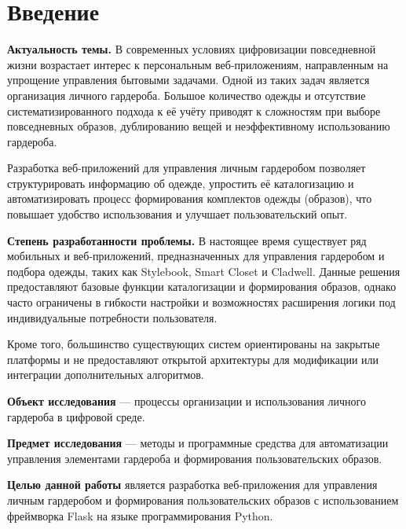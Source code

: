 \section*{Введение}

\textbf{Актуальность темы.}  
В современных условиях цифровизации повседневной жизни возрастает интерес к персональным веб-приложениям, направленным на упрощение управления бытовыми задачами. Одной из таких задач является организация личного гардероба. Большое количество одежды и отсутствие систематизированного подхода к её учёту приводят к сложностям при выборе повседневных образов, дублированию вещей и неэффективному использованию гардероба.

Разработка веб-приложений для управления личным гардеробом позволяет структурировать информацию об одежде, упростить её каталогизацию и автоматизировать процесс формирования комплектов одежды (образов), что повышает удобство использования и улучшает пользовательский опыт.

\textbf{Степень разработанности проблемы.}  
В настоящее время существует ряд мобильных и веб-приложений, предназначенных для управления гардеробом и подбора одежды, таких как Stylebook, Smart Closet и Cladwell. Данные решения предоставляют базовые функции каталогизации и формирования образов, однако часто ограничены в гибкости настройки и возможностях расширения логики под индивидуальные потребности пользователя.

Кроме того, большинство существующих систем ориентированы на закрытые платформы и не предоставляют открытой архитектуры для модификации или интеграции дополнительных алгоритмов.

\textbf{Объект исследования} — процессы организации и использования личного гардероба в цифровой среде.

\textbf{Предмет исследования} — методы и программные средства для автоматизации управления элементами гардероба и формирования пользовательских образов.

\textbf{Целью данной работы} является разработка веб-приложения для управления личным гардеробом и формирования пользовательских образов с использованием фреймворка Flask на языке программирования Python.
